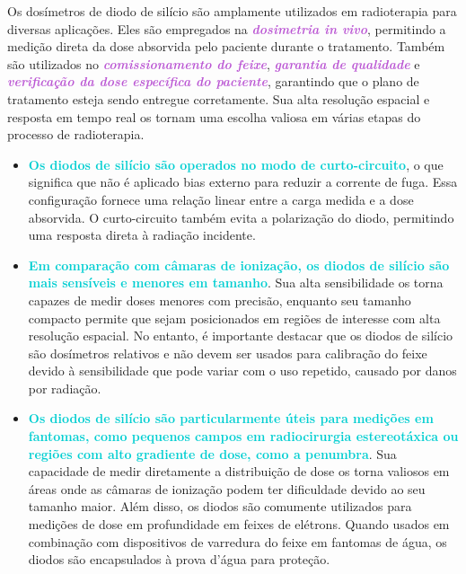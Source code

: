\documentclass[11pt,a4paper]{article}
\newcounter{exemplo}
\begin{document}
	Os dosímetros de diodo de silício são amplamente utilizados em radioterapia para diversas aplicações. Eles são empregados na \textcolor{MediumOrchid}{\textit{\textbf{dosimetria in vivo}}}, permitindo a medição direta da dose absorvida pelo paciente durante o tratamento. Também são utilizados no \textcolor{MediumOrchid}{\textit{\textbf{comissionamento do feixe}}}, \textcolor{MediumOrchid}{\textit{\textbf{garantia de qualidade}}} e \textcolor{MediumOrchid}{\textit{\textbf{verificação da dose específica do paciente}}}, garantindo que o plano de tratamento esteja sendo entregue corretamente. Sua alta resolução espacial e resposta em tempo real os tornam uma escolha valiosa em várias etapas do processo de radioterapia.

	\begin{exemplo}
		\begin{itemize}
			\item \textcolor{DarkTurquoise}{\textbf{Os diodos de silício são operados no modo de curto-circuito}}, o que significa que não é aplicado bias externo para reduzir a corrente de fuga. Essa configuração fornece uma relação linear entre a carga medida e a dose absorvida. O curto-circuito também evita a polarização do diodo, permitindo uma resposta direta à radiação incidente.
			\item \textcolor{DarkTurquoise}{\textbf{Em comparação com câmaras de ionização, os diodos de silício são mais sensíveis e menores em tamanho}}. Sua alta sensibilidade os torna capazes de medir doses menores com precisão, enquanto seu tamanho compacto permite que sejam posicionados em regiões de interesse com alta resolução espacial. No entanto, é importante destacar que os diodos de silício são dosímetros relativos e não devem ser usados para calibração do feixe devido à sensibilidade que pode variar com o uso repetido, causado por danos por radiação.
			\item \textcolor{DarkTurquoise}{\textbf{Os diodos de silício são particularmente úteis para medições em fantomas, como pequenos campos em radiocirurgia estereotáxica ou regiões com alto gradiente de dose, como a penumbra}}. Sua capacidade de medir diretamente a distribuição de dose os torna valiosos em áreas onde as câmaras de ionização podem ter dificuldade devido ao seu tamanho maior. Além disso, os diodos são comumente utilizados para medições de dose em profundidade em feixes de elétrons. Quando usados em combinação com dispositivos de varredura do feixe em fantomas de água, os diodos são encapsulados à prova d'água para proteção.

\end{itemize}
\end{exemplo}
\end{document}
